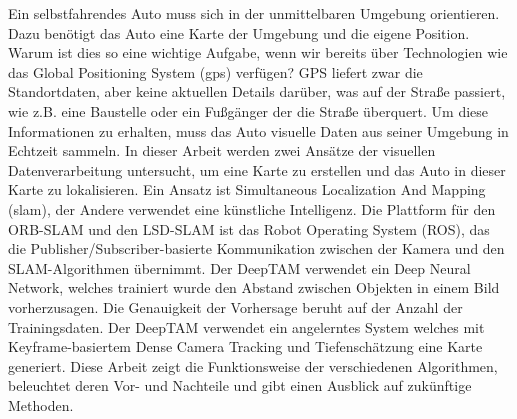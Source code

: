 Ein selbstfahrendes Auto muss sich in der unmittelbaren Umgebung orientieren. Dazu benötigt das Auto eine Karte der Umgebung und die eigene Position. Warum ist dies so eine wichtige Aufgabe, wenn wir bereits über Technologien wie das Global Positioning System (\gls{gps}) verfügen? GPS liefert zwar die Standortdaten, aber keine aktuellen Details darüber, was auf der Straße passiert, wie z.B. eine Baustelle oder ein Fußgänger der die Straße überquert. Um diese Informationen zu erhalten, muss das Auto visuelle Daten aus seiner Umgebung in Echtzeit sammeln. In dieser Arbeit werden zwei Ansätze der visuellen Datenverarbeitung untersucht, um eine Karte zu erstellen und das Auto in dieser Karte zu lokalisieren. Ein Ansatz ist Simultaneous Localization And Mapping (\gls{slam}), der Andere verwendet eine künstliche Intelligenz. Die Plattform für den ORB-SLAM und den LSD-SLAM ist das Robot Operating System (ROS), das die Publisher/Subscriber-basierte Kommunikation zwischen der Kamera und den SLAM-Algorithmen übernimmt. Der DeepTAM verwendet ein Deep Neural Network, welches trainiert wurde den Abstand zwischen Objekten in einem Bild vorherzusagen. Die Genauigkeit der Vorhersage beruht auf der Anzahl der Trainingsdaten. Der DeepTAM verwendet ein angelerntes System welches mit Keyframe-basiertem Dense Camera Tracking und Tiefenschätzung eine Karte generiert. Diese Arbeit zeigt die Funktionsweise der verschiedenen Algorithmen, beleuchtet deren Vor- und Nachteile und gibt einen Ausblick auf zukünftige Methoden.

 


